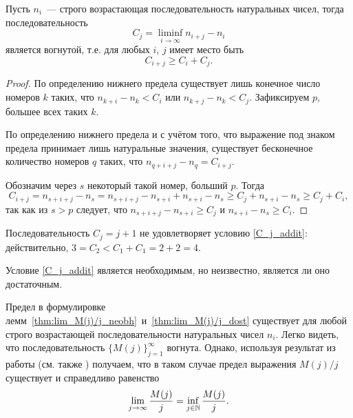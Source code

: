 \begin{lemma}
	Пусть $n_i$~--- строго возрастающая последовательность натуральных чисел,
	тогда последовательность
	\begin{equation}
		C_j = \liminf_{i\to\infty} n_{i+j} - n_i
	\end{equation}
	является вогнутой, т.е. для любых $i$, $j$ имеет место быть
	\begin{equation}\label{C_j_addit}
		C_{i+j} \geq C_i + C_j
		.
	\end{equation}
\end{lemma}

\begin{proof}
	По определению нижнего предела существует лишь конечное число номеров $k$
	таких, что $n_{k+i} - n_k < C_i$ или $n_{k+j} - n_k < C_j$.
	Зафиксируем $p$, большее всех таких $k$.

	По определению нижнего предела и с учётом того, что выражение под знаком предела
	принимает лишь натуральные значения,
	существует бесконечное количество номеров $q$ таких, что $n_{q+i+j} - n_q = C_{i+j}$.

	Обозначим через $s$ некоторый такой номер, больший $p$.
	Тогда
	\begin{equation}
		C_{i+j} = n_{s+i+j} - n_s = n_{s+i+j} - n_{s+i} + n_{s+i} - n_s
		\geq C_j + n_{s+i} - n_s \geq C_j + C_i,
	\end{equation}
	так как из $s>p$ следует, что $n_{s+i+j} - n_{s+i} \geq C_j$ и $n_{s+i} - n_s \geq C_i$.
\end{proof}

\begin{example}
	Последовательность $C_j = j+1$ не удовлетворяет условию \eqref{C_j_addit}:
	действительно, $3=C_2 < C_1+C_1 = 2+2 = 4$.
\end{example}

\begin{remark}
	Условие \eqref{C_j_addit} является необходимым, но неизвестно, является ли оно достаточным.
\end{remark}

\begin{remark}
	Предел в формулировке лемм~\ref{thm:lim_M(j)/j_neobh}~и~\ref{thm:lim_M(j)/j_dost}
	существует для любой строго возрастающей последовательности натуральных чисел $n_i$.
	Легко видеть, что последовательность $\{M(j)\}_{j=1}^\infty$ вогнута.
	Однако, используя результат из работы \cite{Fekete} (см. также \cite[I, Задача 98]{polia1978zadachi}) получаем,
	что в таком случае предел выражения $M(j)/j$ существует и справедливо равенство
	\begin{equation}
		\lim_{j\to\infty}\frac{M(j)}{j} =\inf_{j\in\mathbb{N}}\frac{M(j)}{j}
		.
	\end{equation}
\end{remark}
